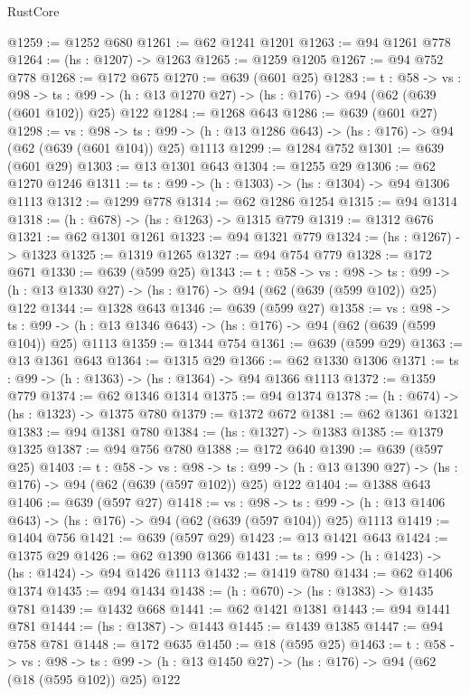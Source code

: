 \begin{lexlean}{RustCore}
\begin{coremodule}
@1259 := @1252 @680
@1261 := @62 @1241 @1201
@1263 := @94 @1261 @778
@1264 := (hs : @1207) -> @1263
@1265 := @1259 @1205
@1267 := @94 @752 @778
@1268 := @172 @675
@1270 := @639 (@601 @25)
@1283 := {t : @58} ->
  {vs : @98} ->
  {ts : @99} -> (h : @13 @1270 @27) -> (hs : @176) -> @94 (@62 (@639 (@601 @102)) @25) @122
@1284 := @1268 @643
@1286 := @639 (@601 @27)
@1298 := {vs : @98} ->
  {ts : @99} -> (h : @13 @1286 @643) -> (hs : @176) -> @94 (@62 (@639 (@601 @104)) @25) @1113
@1299 := @1284 @752
@1301 := @639 (@601 @29)
@1303 := @13 @1301 @643
@1304 := @1255 @29
@1306 := @62 @1270 @1246
@1311 := {ts : @99} -> (h : @1303) -> (hs : @1304) -> @94 @1306 @1113
@1312 := @1299 @778
@1314 := @62 @1286 @1254
@1315 := @94 @1314
@1318 := (h : @678) -> (hs : @1263) -> @1315 @779
@1319 := @1312 @676
@1321 := @62 @1301 @1261
@1323 := @94 @1321 @779
@1324 := (hs : @1267) -> @1323
@1325 := @1319 @1265
@1327 := @94 @754 @779
@1328 := @172 @671
@1330 := @639 (@599 @25)
@1343 := {t : @58} ->
  {vs : @98} ->
  {ts : @99} -> (h : @13 @1330 @27) -> (hs : @176) -> @94 (@62 (@639 (@599 @102)) @25) @122
@1344 := @1328 @643
@1346 := @639 (@599 @27)
@1358 := {vs : @98} ->
  {ts : @99} -> (h : @13 @1346 @643) -> (hs : @176) -> @94 (@62 (@639 (@599 @104)) @25) @1113
@1359 := @1344 @754
@1361 := @639 (@599 @29)
@1363 := @13 @1361 @643
@1364 := @1315 @29
@1366 := @62 @1330 @1306
@1371 := {ts : @99} -> (h : @1363) -> (hs : @1364) -> @94 @1366 @1113
@1372 := @1359 @779
@1374 := @62 @1346 @1314
@1375 := @94 @1374
@1378 := (h : @674) -> (hs : @1323) -> @1375 @780
@1379 := @1372 @672
@1381 := @62 @1361 @1321
@1383 := @94 @1381 @780
@1384 := (hs : @1327) -> @1383
@1385 := @1379 @1325
@1387 := @94 @756 @780
@1388 := @172 @640
@1390 := @639 (@597 @25)
@1403 := {t : @58} ->
  {vs : @98} ->
  {ts : @99} -> (h : @13 @1390 @27) -> (hs : @176) -> @94 (@62 (@639 (@597 @102)) @25) @122
@1404 := @1388 @643
@1406 := @639 (@597 @27)
@1418 := {vs : @98} ->
  {ts : @99} -> (h : @13 @1406 @643) -> (hs : @176) -> @94 (@62 (@639 (@597 @104)) @25) @1113
@1419 := @1404 @756
@1421 := @639 (@597 @29)
@1423 := @13 @1421 @643
@1424 := @1375 @29
@1426 := @62 @1390 @1366
@1431 := {ts : @99} -> (h : @1423) -> (hs : @1424) -> @94 @1426 @1113
@1432 := @1419 @780
@1434 := @62 @1406 @1374
@1435 := @94 @1434
@1438 := (h : @670) -> (hs : @1383) -> @1435 @781
@1439 := @1432 @668
@1441 := @62 @1421 @1381
@1443 := @94 @1441 @781
@1444 := (hs : @1387) -> @1443
@1445 := @1439 @1385
@1447 := @94 @758 @781
@1448 := @172 @635
@1450 := @18 (@595 @25)
@1463 := {t : @58} ->
  {vs : @98} ->
  {ts : @99} -> (h : @13 @1450 @27) -> (hs : @176) -> @94 (@62 (@18 (@595 @102)) @25) @122

\end{coremodule}
\end{lexlean}
